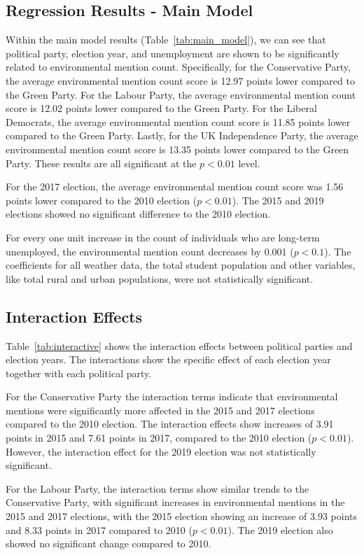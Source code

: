 \documentclass[12pt,letterpaper]{article}
\begin{document}
\subsection{Regression Results - Main Model}


Within the main model results (Table~\ref{tab:main_model}), we can see that political party, election year, and unemployment are shown to be significantly related to environmental mention count. Specifically, for the Conservative Party, the average environmental mention count score is 12.97 points lower compared to the Green Party. For the Labour Party, the average environmental mention count score is 12.02 points lower compared to the Green Party. For the Liberal Democrats, the average environmental mention count score is 11.85 points lower compared to the Green Party. Lastly, for the UK Independence Party, the average environmental mention count score is 13.35 points lower compared to the Green Party. These results are all significant at the $p<0.01$ level.

For the 2017 election, the average environmental mention count score was 1.56 points lower compared to the 2010 election ($p<0.01$). The 2015 and 2019 elections showed no significant difference to the 2010 election. 

For every one unit increase in the count of individuals who are long-term unemployed, the environmental mention count decreases by 0.001 ($p<0.1$). The coefficients for all weather data, the total student population and other variables, like total rural and urban populations, were not statistically significant.


\subsection{Interaction Effects}

Table~\ref{tab:interactive} shows the interaction effects between political parties and election years. The interactions show the specific effect of each election year together with each political party. 

For the Conservative Party the interaction terms indicate that environmental mentions were significantly more affected in the 2015 and 2017 elections compared to the 2010 election. The interaction effects show increases of 3.91 points in 2015 and 7.61 points in 2017, compared to the 2010 election ($p<0.01$). However, the interaction effect for the 2019 election was not statistically significant.

For the Labour Party, the interaction terms show similar trends to the Conservative Party, with significant increases in environmental mentions in the 2015 and 2017 elections, with the 2015 election showing an increase of 3.93 points and 8.33 points in 2017 compared to 2010 ($p<0.01$). The 2019 election also showed no significant change compared to 2010.
\end{document}
